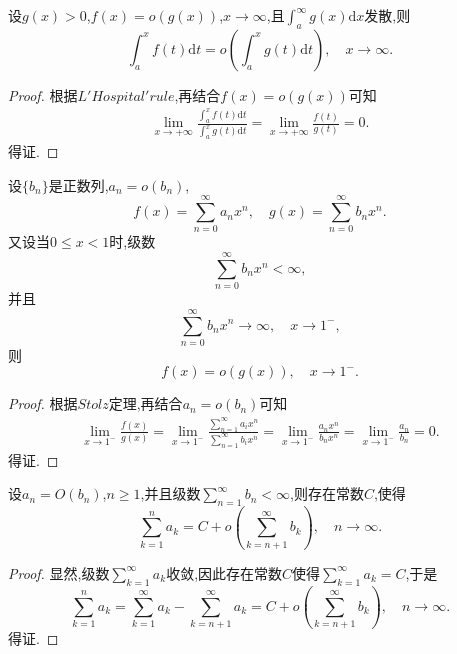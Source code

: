 \documentclass[lang=cn,newtx,10pt,scheme=chinese]{../Template/elegantbook}
\begin{document}
\begin{theorem}\label{theorem:发散积分的积分号与o可交换}
设\(g(x)>0\),\(f(x)=o(g(x))\),\(x\to\infty\),且\(\int_{a}^{\infty}g(x)\mathrm{d}x\)发散,则
\[
\int_{a}^{x}f(t)\mathrm{d}t = o\left(\int_{a}^{x}g(t)\mathrm{d}t\right),\quad x\to\infty.
\]
\end{theorem}
\begin{proof}

根据$L'Hospital'rule$,再结合$f(x)=o(g(x))$可知
\begin{align*}
\underset{x\rightarrow +\infty}{\lim}\frac{\int_a^x{f\left( t \right) \mathrm{d}t}}{\int_a^x{g\left( t \right) \mathrm{d}t}}=\underset{x\rightarrow +\infty}{\lim}\frac{f\left( t \right)}{g\left( t \right)}=0.
\end{align*}得证.

\end{proof}

\begin{theorem}[Abel极限定理]\label{theorem:Abel极限定理}
设\(\{b_n\}\)是正数列,\(a_n = o(b_n)\),
\[
f(x)=\sum_{n = 0}^{\infty}a_nx^n,\quad g(x)=\sum_{n = 0}^{\infty}b_nx^n.
\]
又设当\(0\leqslant  x<1\)时,级数
\[
\sum_{n = 0}^{\infty}b_nx^n<\infty,
\]
并且
\[
\sum_{n = 0}^{\infty}b_nx^n\to\infty,\quad x\to 1^-,
\]
则
\[
f(x)=o(g(x)),\quad x\to 1^-.
\]
\end{theorem}
\begin{proof}

根据$Stolz$定理,再结合$a_n=o(b_n)$可知
\begin{align*}
\underset{x\rightarrow 1^-}{\lim}\frac{f\left( x \right)}{g\left( x \right)}=\underset{x\rightarrow 1^-}{\lim}\frac{\sum\limits_{n=1}^{\infty}{a_ix^n}}{\sum\limits_{n=1}^{\infty}{b_ix^n}}=\underset{x\rightarrow 1^-}{\lim}\frac{a_nx^n}{b_nx^n}=\underset{x\rightarrow 1^-}{\lim}\frac{a_n}{b_n}=0.
\end{align*}
得证.

\end{proof}













\begin{example}
设\(a_n = O(b_n)\),\(n\geqslant 1\),并且级数\(\sum_{n = 1}^{\infty}b_n<\infty\),则存在常数\(C\),使得
\[
\sum_{k = 1}^{n}a_k = C + o\left(\sum_{k = n + 1}^{\infty}b_k\right),\quad n\to\infty.
\]
\end{example}
\begin{proof}

显然,级数\(\sum_{k = 1}^{\infty}a_k\)收敛,因此存在常数\(C\)使得\(\sum_{k = 1}^{\infty}a_k = C\),于是
\[
\sum_{k = 1}^{n}a_k=\sum_{k = 1}^{\infty}a_k-\sum_{k = n + 1}^{\infty}a_k = C + o\left(\sum_{k = n + 1}^{\infty}b_k\right),\quad n\to\infty. 
\]
得证.

\end{proof}
\end{document}
